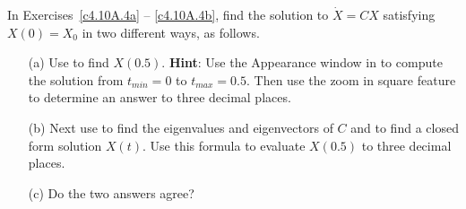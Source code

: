 \documentclass{ximera}
\begin{document}
\noindent In Exercises~\ref{c4.10A.4a} -- \ref{c4.10A.4b}, find the solution 
to $\dot{X} = CX$ satisfying $X(0)=X_0$ in two different ways, as follows.  
\begin{itemize}
\item[(a)]  Use {\pplane} to find $X(0.5)$.  {\bf Hint}: Use the 
{\sf Appearance} window in {\pplane} to compute the solution from 
$t_{min} = 0$ to $t_{max}=0.5$.
Then use the {\sf zoom in square} 
feature to determine an answer to three decimal places.  
\item[(b)]  Next use \Matlab to find the eigenvalues and eigenvectors of $C$ 
and to find a closed form solution $X(t)$.  Use this formula to evaluate 
$X(0.5)$ to three decimal places.    
\item[(c)]  Do the two answers agree?
\end{itemize}
\end{document}
